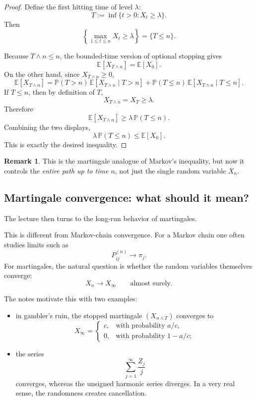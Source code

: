 \documentclass[11pt]{article}
\theoremstyle{definition}
\newtheorem{remark}[theorem]{Remark}
\begin{document}
\begin{proof}
Define the first hitting time of level \(\lambda\):
\[
T:=\inf\{t>0:X_t\ge \lambda\}.
\]
Then
\[
\left\{\max_{1\le t\le n}X_t\ge \lambda\right\}=
\{T\le n\}.
\]

Because \(T\wedge n\le n\), the bounded-time version of optional stopping gives
\[
\mathbb E[X_{T\wedge n}]=\mathbb E[X_0].
\]
On the other hand, since \(X_{T\wedge n}\ge 0\),
\[
\mathbb E[X_{T\wedge n}]
=
\mathbb P(T>n)\,\mathbb E[X_{T\wedge n}\mid T>n]
+
\mathbb P(T\le n)\,\mathbb E[X_{T\wedge n}\mid T\le n].
\]
If \(T\le n\), then by definition of \(T\),
\[
X_{T\wedge n}=X_T\ge \lambda.
\]
Therefore
\[
\mathbb E[X_{T\wedge n}]\ge \lambda\,\mathbb P(T\le n).
\]
Combining the two displays,
\[
\lambda\,\mathbb P(T\le n)\le \mathbb E[X_0].
\]
This is exactly the desired inequality.
\end{proof}

\begin{remark}
This is the martingale analogue of Markov's inequality, but now it controls the \emph{entire path up to time \(n\)}, not just the single random variable \(X_n\).
\end{remark}

\subsection{Martingale convergence: what should it mean?}

The lecture then turns to the long-run behavior of martingales.

This is different from Markov-chain convergence. For a Markov chain one often studies limits such as
\[
P_{ij}^{(n)}\to \pi_j.
\]
For martingales, the natural question is whether the random variables themselves converge:
\[
X_n\to X_\infty
\qquad \text{almost surely.}
\]

The notes motivate this with two examples:
\begin{itemize}[leftmargin=2em]
    \item in gambler's ruin, the stopped martingale \((X_{n\wedge T})\) converges to
    \[
    X_\infty=
    \begin{cases}
    c, & \text{with probability } a/c,\\
    0, & \text{with probability } 1-a/c;
    \end{cases}
    \]
    \item the series
    \[
    \sum_{j=1}^{\infty}\frac{Z_j}{j}
    \]
    converges, whereas the unsigned harmonic series diverges. In a very real sense, the randomness creates cancellation.
\end{itemize}
\end{document}
